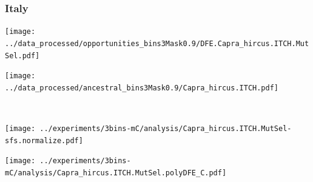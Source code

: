 \subsubsection{Italy}

\begin{minipage}{0.49\linewidth}
    \texttt{[image: ../data\_processed/opportunities\_bins3Mask0.9/DFE.Capra\_hircus.ITCH.MutSel.pdf]}
\end{minipage}
\begin{minipage}{0.49\linewidth}
    \texttt{[image: ../data\_processed/ancestral\_bins3Mask0.9/Capra\_hircus.ITCH.pdf]}
\end{minipage}
\\
\begin{minipage}{0.49\linewidth}
    \texttt{[image: ../experiments/3bins-mC/analysis/Capra\_hircus.ITCH.MutSel-sfs.normalize.pdf]}
\end{minipage}
\begin{minipage}{0.4\linewidth}
    \texttt{[image: ../experiments/3bins-mC/analysis/Capra\_hircus.ITCH.MutSel.polyDFE\_C.pdf]}
\end{minipage}
